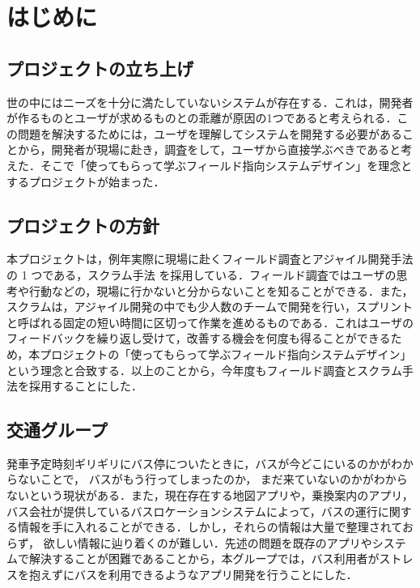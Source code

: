\chapter{はじめに}

\section{プロジェクトの立ち上げ}
世の中にはニーズを十分に満たしていないシステムが存在する．これは，開発者が作るものとユーザが求めるものとの乖離が原因の1つであると考えられる．この問題を解決するためには，ユーザを理解してシステムを開発する必要があることから，開発者が現場に赴き，調査をして，ユーザから直接学ぶべきであると考えた．そこで「使ってもらって学ぶフィールド指向システムデザイン」を理念とするプロジェクトが始まった．

\section{プロジェクトの方針}
本プロジェクトは，例年実際に現場に赴くフィールド調査とアジャイル開発手法の 1 つである，スクラム手法 \cite{scrum}を採用している．フィールド調査ではユーザの思考や行動などの，現場に行かないと分からないことを知ることができる．また，スクラムは，アジャイル開発の中でも少人数のチームで開発を行い，スプリントと呼ばれる固定の短い時間に区切って作業を進めるものである\cite{scrum}．これはユーザのフィードバックを繰り返し受けて，改善する機会を何度も得ることができるため，本プロジェクトの「使ってもらって学ぶフィールド指向システムデザイン」という理念と合致する．以上のことから，今年度もフィールド調査とスクラム手法を採用することにした．

\section{交通グループ}\label{sec:gaiyou}
発車予定時刻ギリギリにバス停についたときに，バスが今どこにいるのかがわからないことで， バスがもう行ってしまったのか， まだ来ていないのかがわからないという現状がある．また，現在存在する地図アプリや，乗換案内のアプリ，バス会社が提供しているバスロケーションシステムによって，バスの運行に関する情報を手に入れることができる．しかし，それらの情報は大量で整理されておらず， 欲しい情報に辿り着くのが難しい．先述の問題を既存のアプリやシステムで解決することが困難であることから，本グループでは，バス利用者がストレスを抱えずにバスを利用できるようなアプリ開発を行うことにした．
